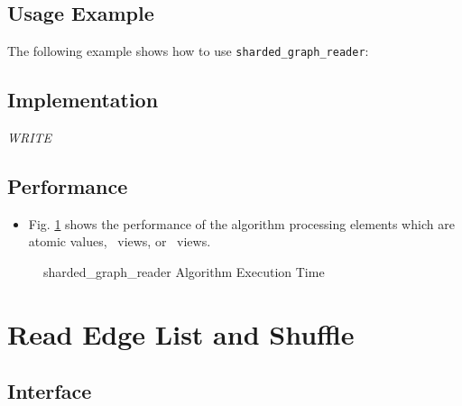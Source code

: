 \subsection{Usage Example} \label{sec-shard-rd-graf-alg-use}

The following example shows how to use 
\texttt{sharded\_graph\_reader}:


\subsection{Implementation} \label{sec-shard-rd-graf-alg-impl}

\textit{WRITE}

\subsection{Performance} \label{sec-shard-rd-graf-alg-perf}

\begin{itemize}
\item
Fig. \ref{fig:shard-rd-graf-alg-exec-exper}
shows the performance of the algorithm processing
elements which are atomic values, \stl\ views, or \stapl\ views.
\end{itemize}

\begin{figure}[p]
\caption{ sharded\_graph\_reader Algorithm Execution Time}
\label{fig:shard-rd-graf-alg-exec-exper}
\end{figure}


\section{Read Edge List and Shuffle}
\label{sec-rd-edge-list-shuf-alg} 

\subsection{Interface} \label{sec-rd-edge-list-alg-inter}

